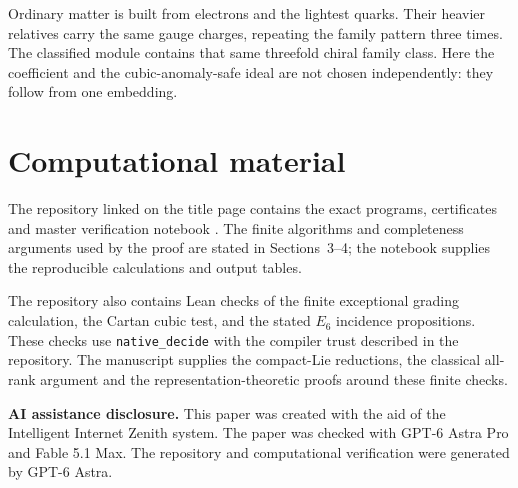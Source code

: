 \documentclass[11pt]{article}
\theoremstyle{remark}
\begin{document}
Ordinary matter is built from electrons and the lightest quarks. Their
heavier relatives carry the same gauge charges, repeating the family
pattern three times. The classified module contains that same threefold
chiral family class. Here the coefficient and the cubic-anomaly-safe ideal
are not chosen independently: they follow from one embedding.

\section*{Computational material}

The repository linked on the title page contains the exact programs,
certificates and master verification notebook \cite{ComputationalCompanion}.
The finite algorithms and completeness arguments used by the proof are
stated in Sections~3--4; the notebook supplies the reproducible calculations
and output tables.

The repository also contains Lean checks of the finite exceptional grading
calculation, the Cartan cubic test, and the stated \(E_6\) incidence
propositions. These checks use \texttt{native\_decide} with the compiler
trust described in the repository. The manuscript supplies the compact-Lie
reductions, the classical all-rank argument and the representation-theoretic
proofs around these finite checks.

\par\medskip
\noindent\textbf{AI assistance disclosure.}
This paper was created with the aid of the Intelligent Internet Zenith
system. The paper was checked with GPT-6 Astra Pro and Fable 5.1 Max.
The repository and computational verification were generated by GPT-6 Astra.
\end{document}
